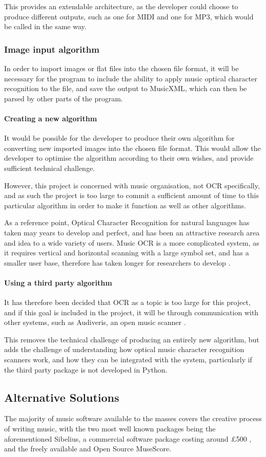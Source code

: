 This provides an extendable architecture, as the developer could choose to produce different outputs, such as one for MIDI and one for MP3, which would be called in the same way.
\subsubsection{Image input algorithm}
In order to import images or flat files into the chosen file format, it will be necessary for the program to include the ability to apply music optical character recognition to the file, and save the output to MusicXML, which can then be parsed by other parts of the program. 

\paragraph{Creating a new algorithm}
It would be possible for the developer to produce their own algorithm for converting new imported images into the chosen file format. This would allow the developer to optimise the algorithm according to their own wishes, and provide sufficient technical challenge.

However, this project is concerned with music organisation, not OCR specifically, and as such the project is too large to commit a sufficient amount of time to this particular algorithm in order to make it function as well as other algorithms. 

As a reference point, Optical Character Recognition for natural languages has taken may years to develop and perfect, and has been an attractive research area and idea to a wide variety of users\parencite{InternationalConf}. Music OCR is a more complicated system, as it requires vertical and horizontal scanning with a large symbol set, and has a smaller user base, therefore has taken longer for researchers to develop \parencite{musicocr}. 

\paragraph{Using a third party algorithm}
It has therefore been decided that OCR as a topic is too large for this project, and if this goal is included in the project, it will be through communication with other systems, such as Audiveris, an open music scanner \parencite{audiveris}. 

This removes the technical challenge of producing an entirely new algorithm, but adds the challenge of understanding how optical music character recognition scanners work, and how they can be integrated with the system, particularly if the third party package is not developed in Python.
\subsection{Alternative Solutions}
The majority of music software available to the masses covers the creative process of writing music, with the two most well known packages being the aforementioned Sibelius, a commercial software package costing around £500 \parencite{avid}, and the freely available and Open Source MuseScore\parencite{MuseTour}.